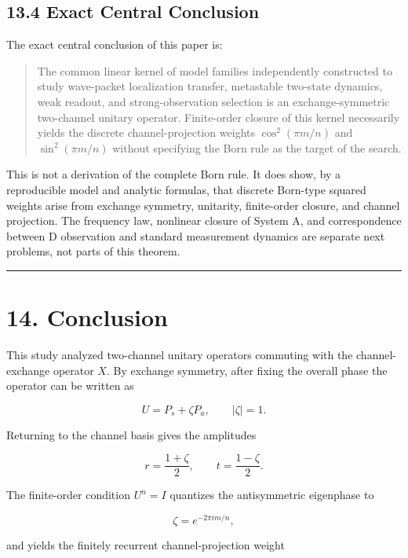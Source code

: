 \documentclass[
  a4paper,
  10pt]{article}
\begin{document}
\subsection{13.4 Exact Central
Conclusion}\label{134-exact-central-conclusion}

The exact central conclusion of this paper is:

\begin{quote}
The common linear kernel of model families independently constructed to
study wave-packet localization transfer, metastable two-state dynamics,
weak readout, and strong-observation selection is an exchange-symmetric
two-channel unitary operator. Finite-order closure of this kernel
necessarily yields the discrete channel-projection weights
\(\cos^2(\pi m/n)\) and \(\sin^2(\pi m/n)\) without specifying the Born
rule as the target of the search.
\end{quote}

This is not a derivation of the complete Born rule. It does show, by a
reproducible model and analytic formulas, that discrete Born-type
squared weights arise from exchange symmetry, unitarity, finite-order
closure, and channel projection. The frequency law, nonlinear closure of
System A, and correspondence between D observation and standard
measurement dynamics are separate next problems, not parts of this
theorem.

\begin{center}\rule{0.5\linewidth}{0.5pt}\end{center}

\section{14. Conclusion}\label{14-conclusion}

This study analyzed two-channel unitary operators commuting with the
channel-exchange operator \(X\). By exchange symmetry, after fixing the
overall phase the operator can be written as

\[
U=P_s+\zeta P_a,
\qquad |\zeta|=1.
\]

Returning to the channel basis gives the amplitudes

\[
r=\frac{1+\zeta}{2},
\qquad
t=\frac{1-\zeta}{2}.
\]

The finite-order condition \(U^n=I\) quantizes the antisymmetric
eigenphase to

\[
\zeta=e^{-2\pi im/n},
\]

and yields the finitely recurrent channel-projection weight
\end{document}
